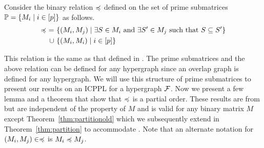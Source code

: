 


\noindent
Consider the binary relation $\preccurlyeq$ defined on the set of
prime submatrices $\mathbb P = \{M_i \mid i \in [p]\}$ as follows.
\begin{align*}
  \primeless \ = \ &\{(M_i,M_j) \mid \exists S \in
  M_i \text{ and } \exists S' \in M_j \text{ \stt\ } S \subseteq S'\} \\
  \cup \  &\{(M_i,M_i) \mid i \in [p]\}
\end{align*}


This relation is the same as that defined in \cite{nsnrs09}. The prime
submatrices and the above relation can be defined for any hypergraph
since an overlap graph is defined for any hypergraph. We will use this
structure of prime submatrices to present our results on an ICPPL for
a hypergraph ${\cal F}$.  Now we present a few lemma and a theorem that
show that $\preccurlyeq$ is a partial order.  These results are from
\cite{nsnrs09} but are independent of the \COP property of $M$ and is
valid for any binary matrix $M$ except Theorem~\ref{thm:partitionold}
which we subsequently extend in Theorem~\ref{thm:partition} to
accommodate \ICPPL.  Note that an alternate notation for $(M_i,M_j)
\in \preccurlyeq$ is $M_i \preccurlyeq M_j$.


